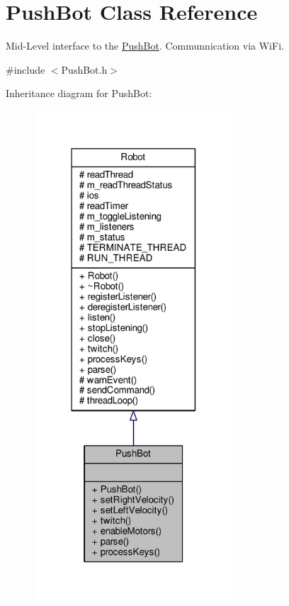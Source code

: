 \hypertarget{class_push_bot}{}\section{Push\+Bot Class Reference}
\label{class_push_bot}


Mid-\/\+Level interface to the \hyperlink{class_push_bot}{Push\+Bot}. Communnication via Wi\+Fi.  




{\ttfamily \#include $<$Push\+Bot.\+h$>$}



Inheritance diagram for Push\+Bot\+:
\nopagebreak
\begin{figure}[H]
\begin{center}
\leavevmode
\includegraphics[width=211pt]{class_push_bot__inherit__graph}
\end{center}
\end{figure}


